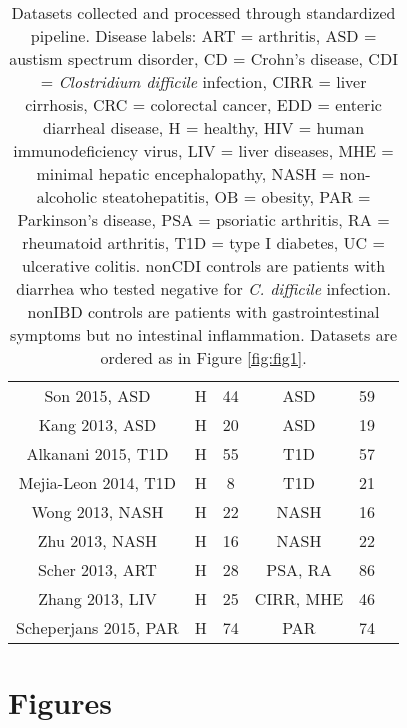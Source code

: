 {{\begin{table}[h]
{\begin{tabular}{c c c c c c}
	Son 2015, ASD & H & 44 & ASD & 59 & \cite{asd-son} \\
	Kang 2013, ASD & H & 20 & ASD & 19 & \cite{asd-kb} \\
	Alkanani 2015, T1D & H & 55 & T1D & 57 & \cite{t1d-alkanani} \\
	Mejia-Leon 2014, T1D & H & 8 & T1D & 21 & \cite{t1d-mejia} \\
	Wong 2013, NASH & H & 22 & NASH & 16 & \cite{nash-chan} \\
	Zhu 2013, NASH & H & 16 & NASH & 22 & \cite{nash-baker} \\
	Scher 2013, ART & H & 28 & PSA, RA & 86 & \cite{ra-littman} \\
	Zhang 2013, LIV & H & 25 & CIRR, MHE & 46 & \cite{mhe-zhang} \\
	Scheperjans 2015, PAR & H & 74 & PAR & 74 & \cite{par-schep} \\
	\hline
\end{tabular}}
\caption{Datasets collected and processed through standardized pipeline. Disease labels: ART = arthritis, ASD = austism spectrum disorder, CD = Crohn's disease, CDI = \textit{Clostridium difficile} infection, CIRR = liver cirrhosis, CRC = colorectal cancer, EDD = enteric diarrheal disease, H = healthy, HIV = human immunodeficiency virus, LIV = liver diseases,  MHE =  minimal hepatic encephalopathy, NASH = non-alcoholic steatohepatitis, OB = obesity, PAR = Parkinson's disease, PSA = psoriatic arthritis, RA = rheumatoid arthritis, T1D = type I diabetes, UC = ulcerative colitis. nonCDI controls are patients with diarrhea who tested negative for \textit{C. difficile} infection. nonIBD controls are patients  with gastrointestinal symptoms but no intestinal inflammation. Datasets are ordered as in Figure \ref{fig:fig1}.}\label{tab:datasets}
\end{table}
}

\FloatBarrier
\clearpage
\section{Figures}

}
